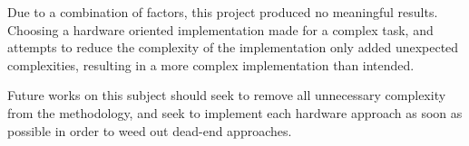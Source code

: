 Due to a combination of factors, this project produced no meaningful results. Choosing a hardware oriented implementation made for a complex task, and attempts to reduce the complexity of the implementation only added unexpected complexities, resulting in a more complex implementation than intended. 

Future works on this subject should seek to remove all unnecessary complexity from the methodology, and seek to implement each hardware approach as soon as possible in order to weed out dead-end approaches.